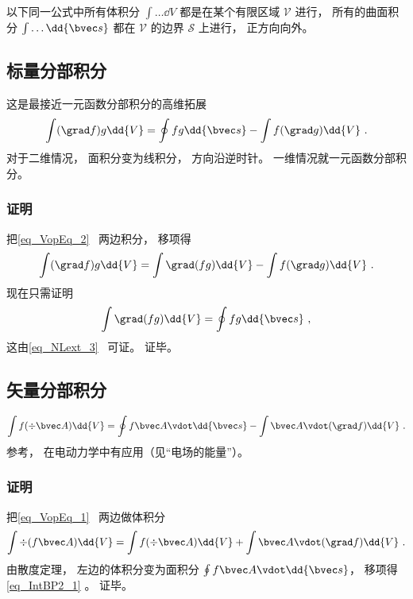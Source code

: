 

以下同一公式中所有体积分 $\int \dots \dd{V}$ 都是在某个有限区域 $\mathcal V$ 进行， 所有的曲面积分 $\int \dots \dd{\bvec s}$ 都在 $\mathcal V$ 的边界 $\mathcal S$ 上进行， 正方向向外。

\subsection{标量分部积分}
这是最接近一元函数分部积分的高维拓展
\begin{equation}\label{eq_IntBP2_2}
\int (\grad f) g \dd{V} = \oint fg \dd{\bvec s} - \int f (\grad g) \dd{V}~.
\end{equation}
对于二维情况， 面积分变为线积分， 方向沿逆时针。 一维情况就一元函数分部积分。

\subsubsection{证明}
把\autoref{eq_VopEq_2}~ 两边积分， 移项得
\begin{equation}
\int (\grad f) g \dd{V} = \int \grad (fg) \dd{V} - \int f (\grad g) \dd{V}~.
\end{equation}
现在只需证明
\begin{equation}
\int \grad (fg) \dd{V} = \oint fg \dd{\bvec s}~,
\end{equation}
这由\autoref{eq_NLext_3}~ 可证。 证毕。

\subsection{矢量分部积分}
\begin{equation}\label{eq_IntBP2_1}
\int f (\div \bvec A)\dd{V} =  \oint f \bvec A \vdot \dd{\bvec s} - \int\bvec A \vdot (\grad f)\dd{V}~.
\end{equation}
参考\cite{GriffE}， 在电动力学中有应用（见“电场的能量”）。

\subsubsection{证明}
把\autoref{eq_VopEq_1}~ 两边做体积分
\begin{equation}
\int\div (f \bvec A) \dd{V} = \int f (\div \bvec A)\dd{V} + \int\bvec A \vdot (\grad f)\dd{V}~.
\end{equation}
由散度定理， 左边的体积分变为面积分 $\oint f \bvec A \vdot \dd{\bvec s}$， 移项得\autoref{eq_IntBP2_1} 。 证毕。
